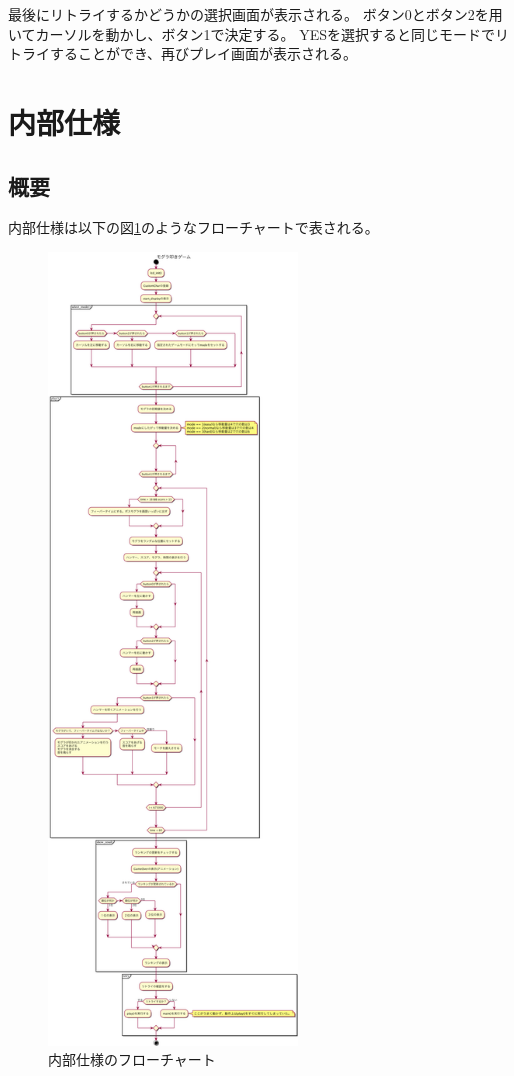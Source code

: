 \documentclass[11pt,a4j]{jsarticle}
\makeatletter
\newcommand{\figcaption}[1]{\def\@captype{figure}\caption{#1}}
\makeatother
\begin{document}
最後にリトライするかどうかの選択画面が表示される。
ボタン0とボタン2を用いてカーソルを動かし、ボタン1で決定する。
YESを選択すると同じモードでリトライすることができ、再びプレイ画面が表示される。


\section{内部仕様}
\label{sec:内部仕様}

\subsection{概要}
\label{sub:概要}

内部仕様は以下の図\ref{fig:flow}のようなフローチャートで表される。

\begin{figure}[H]
  \centering
  \includegraphics[height=210mm,bb=0 0 4408 13975]{img/mogura.png}
  \figcaption{内部仕様のフローチャート}
  \label{fig:flow}
\end{figure}
\end{document}

